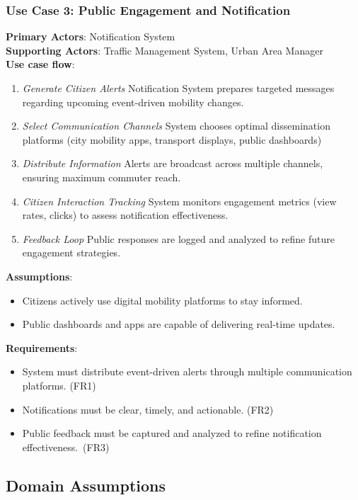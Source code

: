 \documentclass[a4paper,12pt]{article}
\begin{document}
\subsubsection*{Use Case 3: Public Engagement and Notification}
\textbf{Primary Actors}: Notification System \\
\textbf{Supporting Actors}: Traffic Management System, Urban Area Manager\\
\textbf{Use case flow}: 
\begin{enumerate}
    \item \textit{Generate Citizen Alerts}  Notification System prepares targeted messages regarding upcoming event-driven mobility changes.
    \item \textit{Select Communication Channels} System chooses optimal dissemination platforms (city mobility apps, transport displays, public dashboards)
    \item \textit{Distribute Information} Alerts are broadcast across multiple channels, ensuring maximum commuter reach.
    \item \textit{Citizen Interaction Tracking} System monitors engagement metrics (view rates, clicks) to assess notification effectiveness.
    \item \textit{Feedback Loop}  Public responses are logged and analyzed to refine future engagement strategies.
\end{enumerate}
\textbf{Assumptions}: 
\begin{itemize}
    \item Citizens actively use digital mobility platforms to stay informed.
    \item Public dashboards and apps are capable of delivering real-time updates.
\end{itemize}
\textbf{Requirements}:
\begin{itemize}
    \item System must distribute event-driven alerts through multiple communication platforms. (FR1)
    \item Notifications must be clear, timely, and actionable. (FR2)
    \item Public feedback must be captured and analyzed to refine notification effectiveness. (FR3)
\end{itemize}

\newpage

\subsection{Domain Assumptions}
\end{document}
